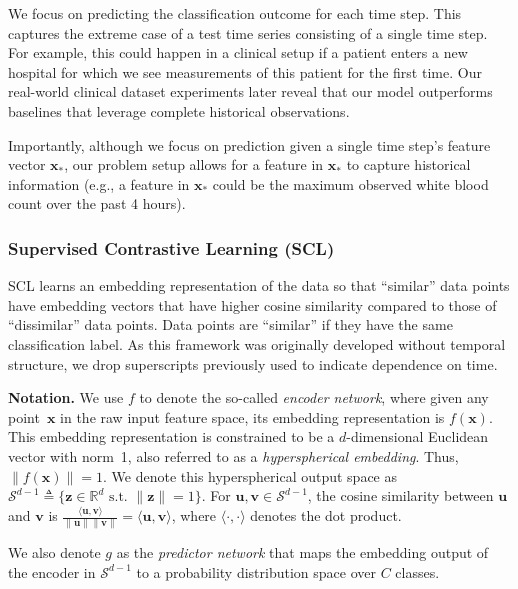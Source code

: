 We focus on predicting the classification outcome for each time step.
This captures the extreme case of a test time series consisting of a single time step. 
For example, this could happen in a clinical setup if a patient enters a new hospital for which we see measurements of this patient for the first time.
Our real-world clinical dataset experiments later reveal that our model outperforms baselines that leverage complete historical observations.

Importantly, although we focus on prediction given a single time step's feature vector $\mathbf{x}_*$, our problem setup allows for a feature in $\mathbf{x}_*$ to capture historical information (e.g., a feature in $\mathbf{x}_*$ could be the maximum observed white blood count over the past 4 hours).


\subsubsection{Supervised Contrastive Learning (SCL)}
\label{ch02:sec:supcon}


SCL learns an embedding representation of the data so that ``similar'' data points have embedding vectors that have higher cosine similarity compared to those of ``dissimilar'' data points.
Data points are ``similar'' if they have the same classification label.
As this framework was originally developed without temporal structure, we drop superscripts previously used to indicate dependence on time.


\noindent
\textbf{Notation.}
We use $f$ to denote the so-called \emph{encoder network}, where given any point~$\mathbf{x}$ in the raw input feature space, its embedding representation is $f(\mathbf{x})$.
This embedding representation is constrained to be a $d$-dimensional Euclidean vector with norm~1, also referred to as a \emph{hyperspherical embedding}.
Thus, $\|f(\mathbf{x})\|=1$.
We denote this hyperspherical output space as $\mathcal{S}^{d-1}\triangleq \{\mathbf{z}\in\mathbb{R}^d\text{ s.t.~}\|\mathbf{z}\|=1\}$.
For $\mathbf{u},\mathbf{v}\in\mathcal{S}^{d-1}$, the cosine similarity between $\mathbf{u}$ and $\mathbf{v}$ is $\frac{\langle \mathbf{u}, \mathbf{v} \rangle}{\|\mathbf{u}\|\|\mathbf{v}\|} = \langle \mathbf{u}, \mathbf{v} \rangle$, where $\langle\cdot,\cdot\rangle$ denotes the dot product.

We also denote $g$ as the \emph{predictor network} that maps the embedding output of the encoder in $\mathcal{S}^{d-1}$ to a probability distribution space over $C$ classes.


